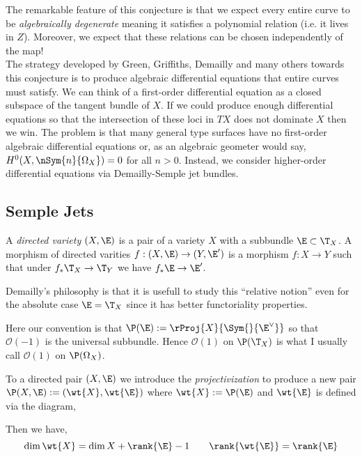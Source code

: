\documentclass[12pt]{article}
\newcommand{\cO}{\mathcal{O}}
\begin{document}
The remarkable feature of this conjecture is that we expect every entire curve to be \textit{algebraically degenerate} meaning it satisfies a polynomial relation (i.e. it lives in $Z$). Moreover, we expect that these relations can be chosen independently of the map! 
\bigskip\\
The strategy developed by Green, Griffiths, Demailly and many others towards this conjecture is to produce algebraic differential equations that entire curves must satisfy. We can think of a first-order differential equation as a closed subspace of the tangent bundle of $X$. If we could produce enough differential equations so that the intersection of these loci in $T X$ does not dominate $X$ then we win. The problem is that many general type surfaces have no first-order algebraic differential equations or, as an algebraic geometer would say, $H^0(X, \nSym{n}{\Omega_X}) = 0$ for all $n > 0$. Instead, we consider higher-order differential equations via Demailly-Semple jet bundles.

\subsection{Semple Jets}

\begin{defn}
A \textit{directed variety} $(X, \E)$ is a pair of a variety $X$ with a subbundle $\E \subset \T_X$. A morphism of directed varities $f : (X, \E) \to (Y, \E')$ is a morphism $f : X \to Y$ such that under $f_* \T_X \to \T_Y$ we have $f_* \E \to \E'$.
\end{defn}

\begin{rmk}
Demailly's philosophy is that it is usefull to study this ``relative notion'' even for the absolute case $\E = \T_X$ since it has better functoriality properties.
\end{rmk}

\begin{rmk}
Here our convention is that $\P(\E) := \rProj{X}{\Sym{}{\E^\vee}}$ so that $\cO(-1)$ is the universal subbundle. Hence $\cO(1)$ on $\P(\T_X)$ is what I usually call $\cO(1)$ on $\P(\Omega_X)$.
\end{rmk}

\begin{defn}
To a directed pair $(X, \E)$ we introduce the \textit{projectivization} to produce a new pair $\P(X, \E) := (\wt{X}, \wt{\E})$ where $\wt{X} := \P(\E)$ and $\wt{\E}$ is defined via the diagram,
\begin{center}
\end{center}
Then we have,
\[ \dim{\wt{X}} = \dim{X} + \rank{\E} - 1 \quad \quad \rank{\wt{\E}} = \rank{\E} \] 
\end{defn}
\end{document}

